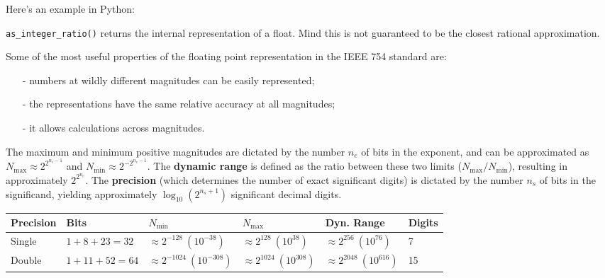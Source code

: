 Here's an example in Python:



\texttt{as\_integer\_ratio()} returns the internal representation of a float. Mind this is not guaranteed to be the closest rational approximation.

Some of the most useful properties of the floating point representation in the IEEE 754 standard are:
\begin{itemize}
    \item[-] numbers at wildly different magnitudes can be easily represented;
    \item[-] the representations have the same relative accuracy at all magnitudes;
    \item[-] it allows calculations across magnitudes.
\end{itemize}
The maximum and minimum positive magnitudes are dictated by the number $n_e$ of bits in the exponent, and can be approximated as $N_{\max} \approx 2^{2^{n_e - 1}}$ and $N_{\min} \approx 2^{-2^{n_e - 1}}$. The \textbf{dynamic range} is defined as the ratio between these two limits ($N_{\max} / N_{\min}$), resulting in approximately $2^{2^{n_e}}$. The \textbf{precision} (which determines the number of exact significant digits) is dictated by the number $n_s$ of bits in the significand, yielding approximately $\log_{10}(2^{n_s + 1})$ significant decimal digits.

\bigskip

\begin{center}
\begin{tabular}{llllll}
  \hline
  Precision & Bits & $N_{\min}$ & $N_{\max}$ & Dyn. Range & Digits \\
  \hline
  \hline
  Single & $1 + 8 + 23 = 32$ & $\approx 2^{-128} \ (10^{-38})$ & $\approx 2^{128} \ (10^{38})$ & $\approx 2^{256} \ (10^{76})$ & 7 \\
  Double & $1 + 11 + 52 = 64$ & $\approx 2^{-1024} \ (10^{-308})$ & $\approx 2^{1024} \ (10^{308})$ & $\approx 2^{2048} \ (10^{616})$ & 15 \\
  \hline
\end{tabular}
\end{center}

